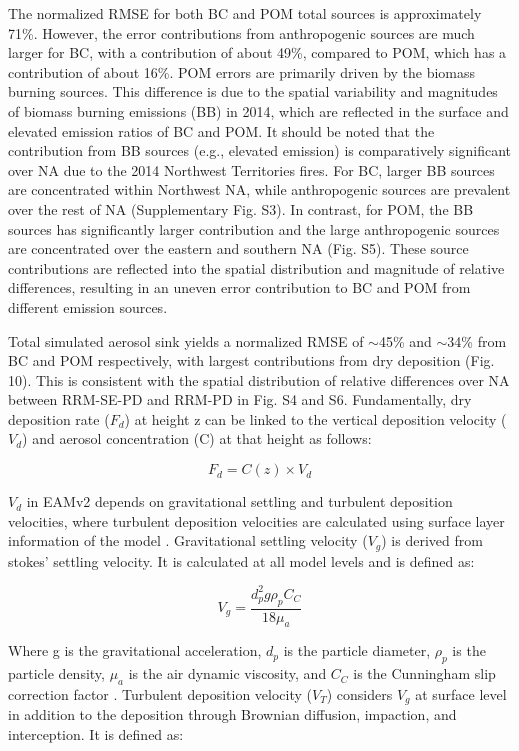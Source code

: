 The normalized RMSE for both BC and POM total sources is approximately 71\%. However, the error contributions from anthropogenic sources are much larger for BC, with a contribution of about 49\%, compared to POM, which has a contribution of about 16\%. POM errors are primarily driven by the biomass burning sources. This difference is due to the spatial variability and magnitudes of biomass burning emissions (BB) in 2014, which are reflected in the surface and elevated emission ratios of BC and POM. It should be noted that the contribution from BB sources (e.g., elevated emission) is comparatively significant over NA due to the 2014 Northwest Territories fires. For BC, larger BB sources are concentrated within Northwest NA, while anthropogenic sources are prevalent over the rest of NA (Supplementary Fig. S3). In contrast, for POM, the BB sources has significantly larger contribution and the large anthropogenic sources are concentrated over the eastern and southern NA (Fig. S5). These source contributions are reflected into the spatial distribution and magnitude of relative differences, resulting in an uneven error contribution to BC and POM from different emission sources.

Total simulated aerosol sink yields a normalized RMSE of $\sim$45\% and $\sim$34\% from BC and POM respectively, with largest contributions from dry deposition (Fig. 10). This is consistent with the spatial distribution of relative differences over NA between RRM-SE-PD and RRM-PD in Fig. S4 and S6. Fundamentally, dry deposition rate ($F_{d}$) at height z can be linked to the vertical deposition velocity ($V_{d}$) and aerosol concentration (C) at that height as follows:

\begin{equation}
F_{d} = C(z) \times V_{d}
\end{equation}

$V_{d}$ in EAMv2 depends on gravitational settling and turbulent deposition velocities, where turbulent deposition velocities are calculated using surface layer information of the model \citep{zhang2001size}. Gravitational settling velocity ($V_{g}$) is derived from stokes’ settling velocity. It is calculated at all model levels and is defined as:

\begin{equation}
V_{g} = \frac{d_{p}^{2}g\rho_{p}C_{C}}{18\mu_{a}}
\end{equation}

Where g is the gravitational acceleration, $d_{p}$ is the particle diameter, $\rho_{p}$ is the particle density, $\mu_{a}$ is the air dynamic viscosity, and $C_{C}$ is the Cunningham slip correction factor \citep{seinfeld1998air}. Turbulent deposition velocity ($V_{T}$) considers $V_{g}$ at surface level in addition to the deposition through Brownian diffusion, impaction, and interception. It is defined as:
 

